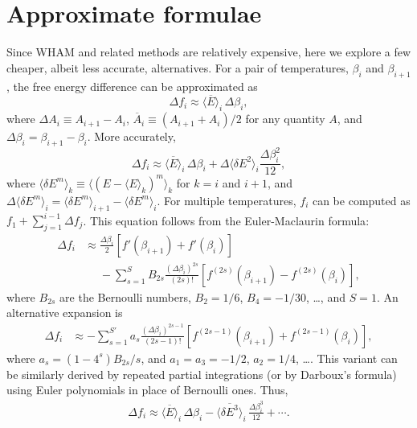 \documentclass[reprint,aip,jcp,superscriptaddress]{revtex4-1}
\begin{document}
\section{\label{sec:approxf}
Approximate formulae}



Since WHAM and related methods
are relatively expensive,
here we explore a few cheaper,
albeit less accurate, alternatives.
%
For a pair of temperatures,
$\beta_i$ and $\beta_{i+1}$,
the free energy difference
can be approximated as\cite{park2007}
%
\begin{equation}
\Delta f_i
\approx
\overline{ \langle E \rangle }_i \, \Delta \beta_i,
\label{eq:df_eav}
\end{equation}
where
$\Delta A_i \equiv A_{i+1} - A_i$,
$\overline{ A }_i \equiv (A_{i+1} + A_i)/2$
for any quantity $A$,
and
$\Delta \beta_i = \beta_{i + 1} - \beta_i$.
%
More accurately,
%
\begin{equation}
\Delta f_i
\approx
\overline{ \langle E \rangle }_i \, \Delta \beta_i
+
\Delta \langle \delta E^2 \rangle_i
\frac{ \Delta \beta_i^2 }{ 12 },
\label{eq:df_eavb}
\end{equation}
%
where
$\langle \delta E^m \rangle_k
\equiv \langle (E - \langle E \rangle_k)^m \rangle_k$
for $k = i$ and $i + 1$,
and
$\Delta \langle \delta E^m \rangle_i
= \langle \delta E^m \rangle_{i + 1}
- \langle \delta E^m \rangle_{i}$.
%
For multiple temperatures, $f_i$
can be computed as
$f_1 + \sum_{j = 1}^{i - 1} \Delta f_j$.
%
This equation follows from
the Euler-Maclaurin formula\cite{
arfken, whittaker, wang_specfunc, abramowitz}:
%
\begin{align*}
\Delta f_i
&\approx
\frac{\Delta \beta_i}{2}
\left[
  f'(\beta_{i+1}) + f'(\beta_i)
\right]
\\
&\phantom{=}
-
\sum_{s = 1}^{S}
  B_{2s}
  \frac{ (\Delta \beta_i)^{2s} } { (2 s)! }
  \left[
    f^{(2s)}(\beta_{i+1})
    -
    f^{(2s)}(\beta_i)
  \right],
\end{align*}
%
where $B_{2s}$ are the Bernoulli numbers,
$B_2 = 1/6$, $B_4 = -1/30$, \ldots,
and $S = 1$.
%
An alternative expansion is
%
\begin{align*}
\Delta f_i
&\approx
-\sum_{s = 1}^{S'}
  a_s
  \frac{ (\Delta \beta_i)^{2s - 1} } { (2 s - 1)! }
  \left[
    f^{(2s-1)}(\beta_{i+1})
    +
    f^{(2s-1)}(\beta_i)
  \right],
\end{align*}
where
$a_s = (1 - 4^s) B_{2s} /s$,
%
and
$a_1 = a_3 = -1/2$,
$a_2 = 1/4$,
\dots.
%
This variant can be similarly derived
by repeated partial integrations
(or by Darboux's formula\cite{
whittaker, wang_specfunc})
using Euler polynomials\cite{
wang_specfunc, abramowitz}
in place of Bernoulli ones.
%
Thus,
\begin{align}
\Delta f_i
\approx
\overline{ \langle E \rangle }_i \, \Delta \beta_i
-
\overline{ \langle \delta E^3 \rangle }_i
\, \frac{ \Delta \beta_i^3 } { 12 }
+ \cdots.
\label{eq:df_eavc}
\end{align}
\end{document}
